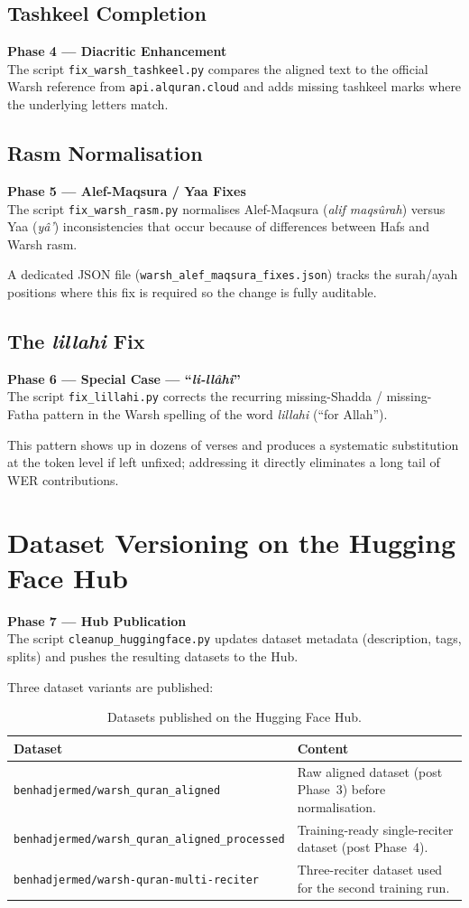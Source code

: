 \documentclass[12pt,a4paper]{report}
\newcommand{\phaseblock}[3]{%
  \begin{tcolorbox}[
    enhanced, colback=white, colframe=black,
    leftrule=5pt, sharp corners, before upper={\parindent0pt}
  ]
  {\bfseries\color{black}Phase #1 --- #2}\\[4pt]
  \small #3
  \end{tcolorbox}%
}
\begin{document}
\subsection{Tashkeel Completion}
\phaseblock{4}{Diacritic Enhancement}{The script
\texttt{fix\_warsh\_tashkeel.py} compares the aligned text to the
official Warsh reference from \texttt{api.alquran.cloud} and adds
missing tashkeel marks where the underlying letters match.}

\subsection{Rasm Normalisation}
\phaseblock{5}{Alef-Maqsura / Yaa Fixes}{The script
\texttt{fix\_warsh\_rasm.py} normalises Alef-Maqsura
(\textit{alif maqs{\^u}rah}) versus Yaa (\textit{y{\^a}'})
inconsistencies that occur because of differences between Hafs and Warsh
rasm.}

A dedicated JSON file (\texttt{warsh\_alef\_maqsura\_fixes.json}) tracks
the surah/ayah positions where this fix is required so the change is
fully auditable.

\subsection{The \textit{lillahi} Fix}
\phaseblock{6}{Special Case --- ``\textit{li-ll{\^a}hi}''}{The script
\texttt{fix\_lillahi.py} corrects the recurring missing-Shadda /
missing-Fatha pattern in the Warsh spelling of the word
\emph{lillahi} (``for Allah'').}

This pattern shows up in dozens of verses and produces a systematic
substitution at the token level if left unfixed; addressing it directly
eliminates a long tail of WER contributions.

\section{Dataset Versioning on the Hugging Face Hub}

\phaseblock{7}{Hub Publication}{The script
\texttt{cleanup\_huggingface.py} updates dataset metadata (description,
tags, splits) and pushes the resulting datasets to the Hub.}

Three dataset variants are published:

\begin{table}[H]
  \centering
  \caption{Datasets published on the Hugging Face Hub.}
  \label{tab:mt_published_datasets}
  \renewcommand{\arraystretch}{1.3}
  \begin{tabular}{lp{8.5cm}}
    \toprule
    \textbf{Dataset} & \textbf{Content} \\
    \midrule
    \texttt{benhadjermed/warsh\_quran\_aligned} & Raw aligned dataset (post Phase~3) before normalisation. \\
    \texttt{benhadjermed/warsh\_quran\_aligned\_processed} & Training-ready single-reciter dataset (post Phase~4). \\
    \texttt{benhadjermed/warsh-quran-multi-reciter} & Three-reciter dataset used for the second training run. \\
    \bottomrule
  \end{tabular}
\end{table}
\end{document}
